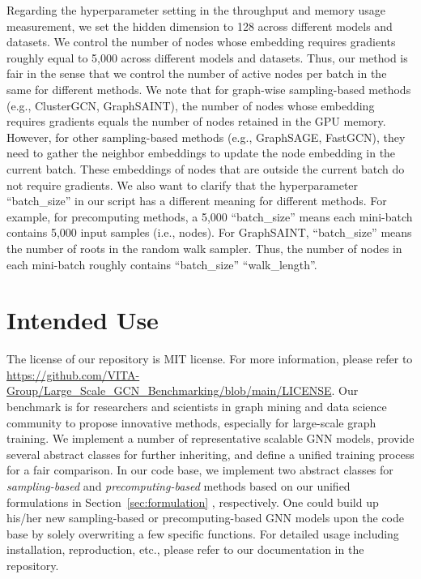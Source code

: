 \message{ !name(main.tex)}\documentclass{article}
\begin{document}
Regarding the hyperparameter setting in the throughput and memory usage measurement,
we set the hidden dimension to 128 across different models and datasets.
We control the number of nodes whose embedding requires gradients roughly equal to 5,000 across different models and datasets.
Thus, our method is fair in the sense that we control the number of active nodes per batch in the same for different methods.
We note that for graph-wise sampling-based methods (e.g., ClusterGCN, GraphSAINT),  the number of nodes whose embedding requires gradients equals the number of nodes retained in the GPU memory.
However, for other sampling-based methods (e.g., GraphSAGE, FastGCN), they need to gather the neighbor embeddings to update the node embedding in the current batch.
These embeddings of nodes that are outside the current batch do not require gradients.
We also want to clarify that the hyperparameter ``batch\_size'' in our script has a different meaning for different methods.
For example, for precomputing methods, a 5,000 ``batch\_size'' means each mini-batch contains 5,000 input samples (i.e., nodes).
For GraphSAINT, ``batch\_size'' means the number of roots in the random walk sampler.
Thus, the number of nodes in each mini-batch roughly contains ``batch\_size''  ``walk\_length''.

\vspace{-4mm}
\section{Intended Use}
\vspace{-2mm}
The license of our repository is MIT license. For more information, please refer to \url{https://github.com/VITA-Group/Large_Scale_GCN_Benchmarking/blob/main/LICENSE}. Our benchmark is for researchers and scientists in graph mining and data science community to propose innovative methods, especially for large-scale graph training. We implement a number of representative scalable GNN models, provide several abstract classes for further inheriting, and define a unified training process for a fair comparison.
In our code base, we implement two abstract classes for \textit{sampling-based} and \textit{precomputing-based} methods based on our unified formulations in Section~\ref{sec:formulation} , respectively. One could build up his/her new sampling-based or precomputing-based GNN models upon the code base by solely overwriting a few specific functions. For detailed usage including installation, reproduction, etc., please refer to our documentation in the repository.
 
\end{document}
